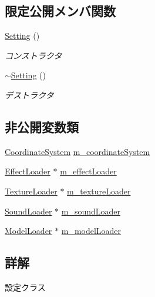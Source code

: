 \subsection*{限定公開メンバ関数}
\begin{DoxyCompactItemize}
\item 
\mbox{\hyperlink{class_effekseer_1_1_setting_ac499390c801e98da46d278ef85e22cf6}{Setting}} ()
\begin{DoxyCompactList}\small\item\em コンストラクタ \end{DoxyCompactList}\item 
\mbox{\hyperlink{class_effekseer_1_1_setting_a0f16b991666d7968cefd52f61c61ccec}{$\sim$\+Setting}} ()
\begin{DoxyCompactList}\small\item\em デストラクタ \end{DoxyCompactList}\end{DoxyCompactItemize}
\subsection*{非公開変数類}
\begin{DoxyCompactItemize}
\item 
\mbox{\hyperlink{namespace_effekseer_ac8508f8823c5fcf36aac5d2ddee23765}{Coordinate\+System}} \mbox{\hyperlink{class_effekseer_1_1_setting_af37739356b4116d84dd38d2aba817836}{m\+\_\+coordinate\+System}}
\item 
\mbox{\hyperlink{class_effekseer_1_1_effect_loader}{Effect\+Loader}} $\ast$ \mbox{\hyperlink{class_effekseer_1_1_setting_aa72aea5933efe362ecf28210ea202350}{m\+\_\+effect\+Loader}}
\item 
\mbox{\hyperlink{class_effekseer_1_1_texture_loader}{Texture\+Loader}} $\ast$ \mbox{\hyperlink{class_effekseer_1_1_setting_a05cf55c34e1d640e2080f15b3478ea0b}{m\+\_\+texture\+Loader}}
\item 
\mbox{\hyperlink{class_effekseer_1_1_sound_loader}{Sound\+Loader}} $\ast$ \mbox{\hyperlink{class_effekseer_1_1_setting_a1da02ce0c370b60c2fa5a0d76e85eeb6}{m\+\_\+sound\+Loader}}
\item 
\mbox{\hyperlink{class_effekseer_1_1_model_loader}{Model\+Loader}} $\ast$ \mbox{\hyperlink{class_effekseer_1_1_setting_a85340df413c521f9372f617512bc58d8}{m\+\_\+model\+Loader}}
\end{DoxyCompactItemize}


\subsection{詳解}
設定クラス 

